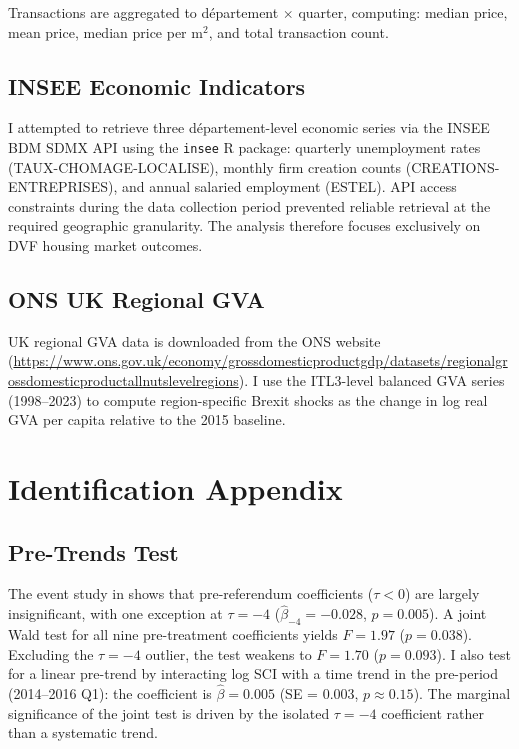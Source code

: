 \documentclass[12pt]{article}
\begin{document}
Transactions are aggregated to d\'epartement $\times$ quarter, computing: median price, mean price, median price per m$^2$, and total transaction count.

\subsection{INSEE Economic Indicators}

I attempted to retrieve three d\'epartement-level economic series via the INSEE BDM SDMX API using the \texttt{insee} R package: quarterly unemployment rates (TAUX-CHOMAGE-LOCALISE), monthly firm creation counts (CREATIONS-ENTREPRISES), and annual salaried employment (ESTEL). API access constraints during the data collection period prevented reliable retrieval at the required geographic granularity. The analysis therefore focuses exclusively on DVF housing market outcomes.

\subsection{ONS UK Regional GVA}

UK regional GVA data is downloaded from the ONS website (\url{https://www.ons.gov.uk/economy/grossdomesticproductgdp/datasets/regionalgrossdomesticproductallnutslevelregions}). I use the ITL3-level balanced GVA series (1998--2023) to compute region-specific Brexit shocks as the change in log real GVA per capita relative to the 2015 baseline.

\section{Identification Appendix}

\subsection{Pre-Trends Test}

The event study in  shows that pre-referendum coefficients ($\tau < 0$) are largely insignificant, with one exception at $\tau = -4$ ($\hat{\beta}_{-4} = -0.028$, $p = 0.005$). A joint Wald test for all nine pre-treatment coefficients yields $F = 1.97$ ($p = 0.038$). Excluding the $\tau = -4$ outlier, the test weakens to $F = 1.70$ ($p = 0.093$). I also test for a linear pre-trend by interacting log SCI with a time trend in the pre-period (2014--2016 Q1): the coefficient is $\hat{\beta} = 0.005$ (SE = 0.003, $p \approx 0.15$). The marginal significance of the joint test is driven by the isolated $\tau = -4$ coefficient rather than a systematic trend.
\end{document}
